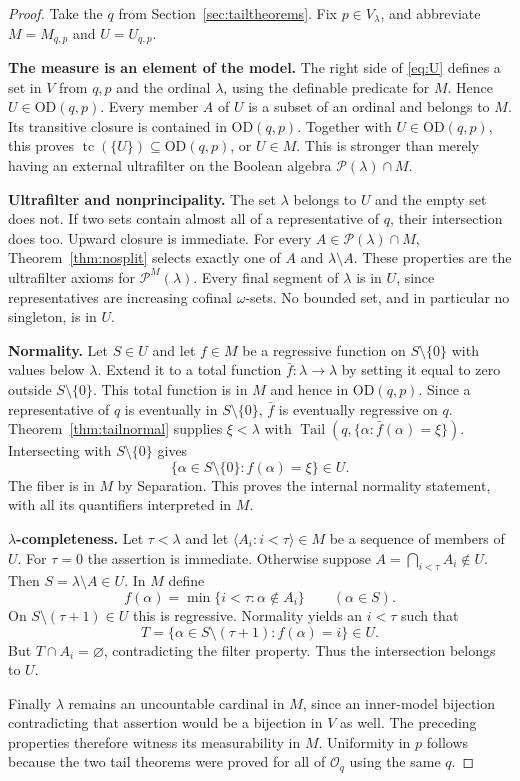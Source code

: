 \documentclass[11pt,letterpaper]{article}
\theoremstyle{definition}
\numberwithin{equation}{section}
\newcommand{\OD}{\mathrm{OD}}
\newcommand{\Pow}{\mathcal P}
\newcommand{\tc}{\operatorname{tc}}
\newcommand{\Tail}{\operatorname{Tail}}
\begin{document}
\begin{proof}
Take the $q$ from Section~\ref{sec:tailtheorems}. Fix $p\in V_\lambda$,
and abbreviate $M=M_{q,p}$ and $U=U_{q,p}$.

\textbf{The measure is an element of the model.}
The right side of \eqref{eq:U} defines a set in $V$ from $q,p$ and the
ordinal $\lambda$, using the definable predicate for $M$.
Hence $U\in\OD(q,p)$. Every member $A$ of $U$ is a subset of an ordinal
and belongs to $M$. Its transitive closure is contained in
$\OD(q,p)$. Together with $U\in\OD(q,p)$, this proves
$\tc(\{U\})\subseteq\OD(q,p)$, or $U\in M$.
This is stronger than merely having an external ultrafilter on the
Boolean algebra $\Pow(\lambda)\cap M$.

\textbf{Ultrafilter and nonprincipality.}
The set $\lambda$ belongs to $U$ and the empty set does not. If two sets
contain almost all of a representative of $q$, their intersection does
too. Upward closure is immediate. For every $A\in\Pow(\lambda)\cap M$,
Theorem~\ref{thm:nosplit} selects exactly one of $A$ and
$\lambda\setminus A$. These properties are the ultrafilter axioms for
$\Pow^M(\lambda)$. Every final segment of $\lambda$ is in $U$, since
representatives are increasing cofinal $\omega$-sets. No bounded set,
and in particular no singleton, is in $U$.

\textbf{Normality.}
Let $S\in U$ and let $f\in M$ be a regressive function on $S\setminus\{0\}$
with values below $\lambda$. Extend it to a total function
$\bar f:\lambda\to\lambda$ by setting it equal to zero outside
$S\setminus\{0\}$. This total function is in $M$ and hence in
$\OD(q,p)$. Since a representative of $q$ is eventually in
$S\setminus\{0\}$, $\bar f$ is eventually regressive on $q$.
Theorem~\ref{thm:tailnormal} supplies $\xi<\lambda$ with
$\Tail(q,\{\alpha:\bar f(\alpha)=\xi\})$.
Intersecting with $S\setminus\{0\}$ gives
\[
 \{\alpha\in S\setminus\{0\}:f(\alpha)=\xi\}\in U.
\]
The fiber is in $M$ by Separation. This proves the internal normality
statement, with all its quantifiers interpreted in $M$.

\textbf{$\lambda$-completeness.}
Let $\tau<\lambda$ and let
$\langle A_i:i<\tau\rangle\in M$ be a sequence of members of $U$.
For $\tau=0$ the assertion is immediate. Otherwise suppose
$A=\bigcap_{i<\tau}A_i\notin U$. Then
$S=\lambda\setminus A\in U$. In $M$ define
\[
 f(\alpha)=\min\{i<\tau:\alpha\notin A_i\}
 \qquad(\alpha\in S).
\]
On $S\setminus(\tau+1)\in U$ this is regressive. Normality yields an
$i<\tau$ such that
\[
 T=\{\alpha\in S\setminus(\tau+1):f(\alpha)=i\}\in U.
\]
But $T\cap A_i=\varnothing$, contradicting the filter property.
Thus the intersection belongs to $U$.

Finally $\lambda$ remains an uncountable cardinal in $M$, since an
inner-model bijection contradicting that assertion would be a
bijection in $V$ as well. The preceding properties therefore witness
its measurability in $M$. Uniformity in $p$ follows because the two tail
theorems were proved for all of $\mathcal O_q$ using the same $q$.
\end{proof}
\end{document}
